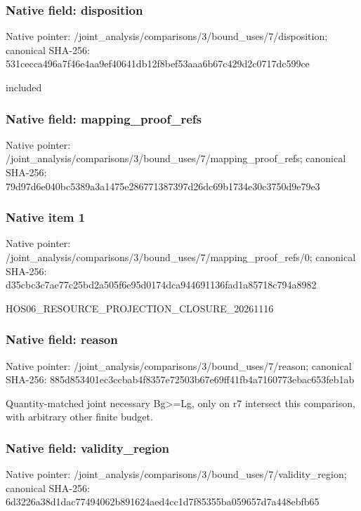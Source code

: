 \documentclass[10pt,a4paper]{article}
\begin{document}
\subsubsection{Native field: disposition}
Native pointer: /joint\_\allowbreak{}analysis/comparisons/3/bound\_\allowbreak{}uses/7/disposition; canonical SHA-256: 531cecca496a7f46e4aa9ef40641db12f8bef53aaa6b67c429d2c0717dc599ce

\begingroup\raggedright\sloppy included\par\endgroup

\subsubsection{Native field: mapping\_\allowbreak{}proof\_\allowbreak{}refs}
Native pointer: /joint\_\allowbreak{}analysis/comparisons/3/bound\_\allowbreak{}uses/7/mapping\_\allowbreak{}proof\_\allowbreak{}refs; canonical SHA-256: 79d97d6e040bc5389a3a1475e286771387397d26dc69b1734e30c3750d9e79e3

\subsubsection{Native item 1}
Native pointer: /joint\_\allowbreak{}analysis/comparisons/3/bound\_\allowbreak{}uses/7/mapping\_\allowbreak{}proof\_\allowbreak{}refs/0; canonical SHA-256: d35cbc3c7ae77c25bd2a505f6e95d0174dca944691136fad1a85718c794a8982

\begingroup\raggedright\sloppy HOS06\_\allowbreak{}RESOURCE\_\allowbreak{}PROJECTION\_\allowbreak{}CLOSURE\_\allowbreak{}20261116\par\endgroup

\subsubsection{Native field: reason}
Native pointer: /joint\_\allowbreak{}analysis/comparisons/3/bound\_\allowbreak{}uses/7/reason; canonical SHA-256: 885d853401ec3ccbab4f8357e72503b67e69ff41fb4a7160773ebac653feb1ab

\begingroup\raggedright\sloppy Quantity-matched joint necessary Bg>=\allowbreak{}Lg,\allowbreak{} only on r7 intersect this comparison,\allowbreak{} with arbitrary other finite budget.\par\endgroup

\subsubsection{Native field: validity\_\allowbreak{}region}
Native pointer: /joint\_\allowbreak{}analysis/comparisons/3/bound\_\allowbreak{}uses/7/validity\_\allowbreak{}region; canonical SHA-256: 6d3226a38d1dac77494062b891624aed4cc1d7f85355ba059657d7a448ebfb65
\end{document}
